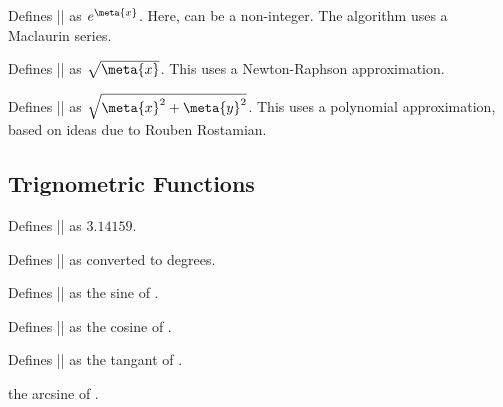 \begin{command}{\pgfmathexp{}}                
	Defines |\pgfmathresult| as $e^{\meta{x}}$. Here,  can be a 
	non-integer. The algorithm	uses a Maclaurin series.               
\end{command}
	
\begin{command}{\pgfmathsqrt{}} 
	Defines |\pgfmathresult| as $\sqrt{\meta{x}}$. This uses a 
	Newton-Raphson approximation. 
\end{command}
	
\begin{command}{\pgfmathveclen{}}        
	Defines |\pgfmathresult| as $\sqrt{\meta{x}^2+\meta{y}^2}$. This uses
	a polynomial approximation, based on ideas due to Rouben Rostamian.                                    
\end{command}


\subsection{Trignometric Functions}

\label{pgfmath-trigonmetry}

\begin{command}{\pgfmathpi}
  	Defines |\pgfmathresult| as $3.14159$.
\end{command}
   
\begin{command}{} 
	Defines |\pgfmathresult| as  converted to degrees.
\end{command}

\begin{command}{}  
	Defines |\pgfmathresult| as the sine of .  
\end{command}

\begin{command}{}
	Defines |\pgfmathresult| as the cosine of .
\end{command}

\begin{command}{}  
	Defines |\pgfmathresult| as the tangant of .  
\end{command}

\begin{command}{}
	the arcsine of .
\end{command}

